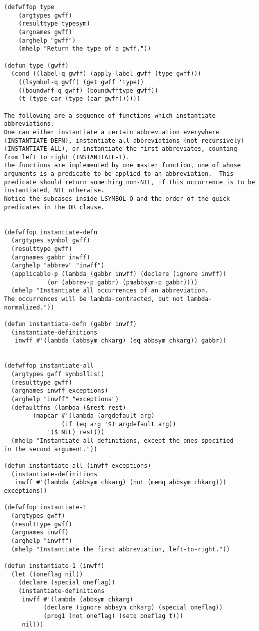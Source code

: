 \begin{verbatim}
(defwffop type
	(argtypes gwff)
	(resulttype typesym)
	(argnames gwff)
	(arghelp "gwff")
	(mhelp "Return the type of a gwff."))

(defun type (gwff)
  (cond ((label-q gwff) (apply-label gwff (type gwff)))
	((lsymbol-q gwff) (get gwff 'type))
	((boundwff-q gwff) (boundwfftype gwff))
	(t (type-car (type (car gwff))))))

The following are a sequence of functions which instantiate abbreviations.
One can either instantiate a certain abbreviation everywhere
(INSTANTIATE-DEFN), instantiate all abbreviations (not recursively)
(INSTANTIATE-ALL), or instantiate the first abbreviates, counting
from left to right (INSTANTIATE-1).
The functions are implemented by one master function, one of whose
arguments is a predicate to be applied to an abbreviation.  This
predicate should return something non-NIL, if this occurrence is to be
instantiated, NIL otherwise.
Notice the subcases inside LSYMBOL-Q and the order of the quick
predicates in the OR clause.


(defwffop instantiate-defn
  (argtypes symbol gwff)
  (resulttype gwff)
  (argnames gabbr inwff)
  (arghelp "abbrev" "inwff")
  (applicable-p (lambda (gabbr inwff) (declare (ignore inwff))
			(or (abbrev-p gabbr) (pmabbsym-p gabbr))))
  (mhelp "Instantiate all occurrences of an abbreviation.
The occurrences will be lambda-contracted, but not lambda-normalized."))

(defun instantiate-defn (gabbr inwff)
  (instantiate-definitions 
   inwff #'(lambda (abbsym chkarg) (eq abbsym chkarg)) gabbr))


(defwffop instantiate-all
  (argtypes gwff symbollist)
  (resulttype gwff)
  (argnames inwff exceptions)
  (arghelp "inwff" "exceptions")
  (defaultfns (lambda (&rest rest)
		(mapcar #'(lambda (argdefault arg) 
			    (if (eq arg '$) argdefault arg))
			'($ NIL) rest)))
  (mhelp "Instantiate all definitions, except the ones specified
in the second argument."))

(defun instantiate-all (inwff exceptions)
  (instantiate-definitions
   inwff #'(lambda (abbsym chkarg) (not (memq abbsym chkarg))) exceptions))

(defwffop instantiate-1
  (argtypes gwff)
  (resulttype gwff)
  (argnames inwff)
  (arghelp "inwff")
  (mhelp "Instantiate the first abbreviation, left-to-right."))

(defun instantiate-1 (inwff)
  (let ((oneflag nil))
    (declare (special oneflag))
    (instantiate-definitions
     inwff #'(lambda (abbsym chkarg)
	       (declare (ignore abbsym chkarg) (special oneflag))
	       (prog1 (not oneflag) (setq oneflag t)))
     nil)))


\end{verbatim}
